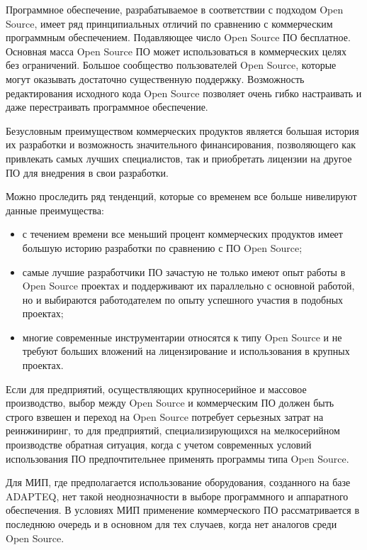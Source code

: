 Программное обеспечение, разрабатываемое в соответствии с подходом Open Source, имеет ряд принципиальных отличий по сравнению с коммерческим программным обеспечением. Подавляющее число Open Source ПО бесплатное. Основная масса Open Source ПО может использоваться в коммерческих целях без ограничений. Большое сообщество пользователей Open Source, которые могут оказывать достаточно существенную поддержку. Возможность редактирования исходного кода Open Source позволяет очень гибко настраивать и даже перестраивать программное обеспечение.

Безусловным преимуществом коммерческих продуктов является большая история их разработки и возможность значительного финансирования, позволяющего как привлекать самых лучших специалистов, так и приобретать лицензии на другое ПО для внедрения в свои разработки.

Можно проследить ряд тенденций, которые со временем все больше нивелируют данные преимущества:
\begin{itemize}
	\item с течением  времени все меньший процент коммерческих продуктов имеет большую историю разработки по сравнению с ПО Open Source;
	
	\item самые лучшие разработчики ПО зачастую не только имеют опыт работы в Open Source проектах и  поддерживают их параллельно с основной работой, но и выбираются работодателем по опыту успешного участия в подобных проектах;
	
	\item многие современные инструментарии относятся к типу Open Source и не требуют больших вложений на лицензирование и использования в крупных проектах.
	
	
\end{itemize}
Если для предприятий, осуществляющих крупносерийное и массовое производство, выбор между Open Source и коммерческим ПО должен быть строго взвешен и переход на Open Source потребует серьезных затрат на реинжиниринг, то для предприятий, специализирующихся на мелкосерийном производстве обратная ситуация, когда с учетом современных условий использования ПО предпочтительнее применять программы типа Open Source.

Для МИП, где предполагается использование оборудования, созданного на базе \foreignlanguage{english}{ADAPTEQ}, нет такой неоднозначности в выборе программного и аппаратного обеспечения. В условиях МИП применение коммерческого ПО рассматривается в последнюю очередь и в основном для тех случаев, когда нет аналогов среди Open Source.

